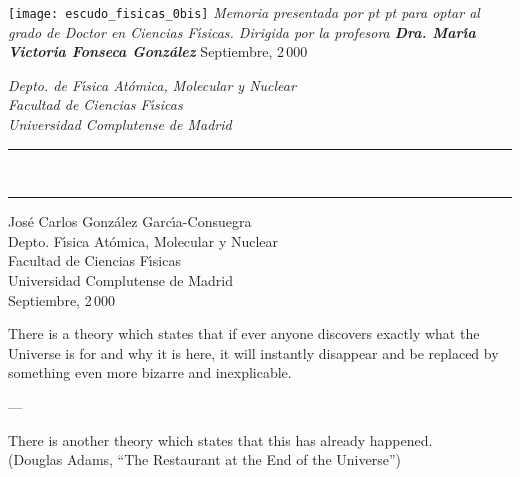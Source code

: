\thispagestyle{empty}  

\mbox{} \vskip 20pt

\begin{center}
  {\Huge \sffamily \bfseries \sc \mititulo}
  \vskip 20pt
  \texttt{[image: escudo\_fisicas\_0bis]}
  \vskip 20pt
  {\large \itshape
    Memoria presentada por   pt
    {\Large \bfseries \rm \yo}   pt
    para optar al grado de Doctor en Ciencias F{\'{\i}}sicas. \vskip 40pt
    Dirigida por la profesora \vskip 25pt
    {\Large \bfseries \rm Dra. Mar{\'{\i}}a Victoria Fonseca Gonz{\'{a}}lez}
    } \vskip 35pt
  {\Large \rm Septiembre, 2\,000 \\} \vskip 35pt
  
  {\it \small
    Depto. de F{\'{\i}}sica At{\'{o}}mica, Molecular y Nuclear\\
    Facultad de Ciencias F{\'{\i}}sicas\\
    Universidad Complutense de Madrid\\
    }  
\end{center}

\echapter %

\thispagestyle{empty}  

\vspace*{2cm}
\begin{flushright}
  \rule{.7\linewidth}{1pt}\\
  \Large \mititulo
  \rule{.7\linewidth}{1pt}
\end{flushright}
\vspace*{6cm}
\begin{flushright}
  \large 
Jos{\'{e}} Carlos Gonz{\'{a}}lez Garc{\'{\i}}a-Consuegra\\[15 mm]
Depto. F{\'{\i}}sica At{\'{o}}mica, Molecular y Nuclear\\
Facultad de Ciencias F{\'{\i}}sicas\\
Universidad Complutense de Madrid\\[15 mm]
Septiembre, 2\,000
\end{flushright}

\echapter %

\thispagestyle{empty}  

\vspace*{2cm} 
%
\hfill 
\parbox[b]{0.65\linewidth}{ 
%
\itshape
%
\raggedright
%
There is a theory which states that if ever anyone discovers exactly
what the Universe is for and why it is here, it will instantly
disappear and be replaced by something even more bizarre and
inexplicable. \\
%
\vspace{5pt}
\centerline{---}
\vspace{5pt}
%
There is another theory which states that this has already happened. \\
%
\vspace{15pt}
%
\upshape
%
\raggedleft
%
{\footnotesize (Douglas Adams, ``The Restaurant at the End of the
  Universe'')}
%
} 

\echapter %

\endinput
%

